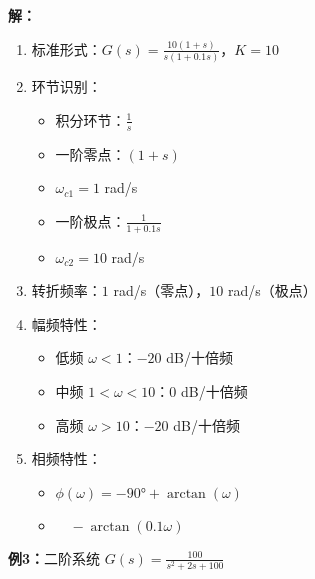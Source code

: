 \begin{tcolorbox}[colback=blue!5!white,colframe=blue!75!black,title=例2求解过程与伯德图]

\begin{minipage}[t]{0.47\textwidth}
\textbf{解：}
\begin{enumerate}
    \item 标准形式：$G(s) = \frac{10(1+s)}{s(1+0.1s)}$，$K = 10$
    \item 环节识别：
    \begin{itemize}
        \item 积分环节：$\frac{1}{s}$
        \item 一阶零点：$(1+s)$
        \item $\omega_{c1} = 1$ rad/s
        \item 一阶极点：$\frac{1}{1+0.1s}$
        \item $\omega_{c2} = 10$ rad/s
    \end{itemize}
    \item 转折频率：$1$ rad/s（零点），$10$ rad/s（极点）
    \item 幅频特性：
    \begin{itemize}
        \item 低频 $\omega<1$：$-20$ dB/十倍频
        \item 中频 $1<\omega<10$：$0$ dB/十倍频
        \item 高频 $\omega>10$：$-20$ dB/十倍频
    \end{itemize}
    \item 相频特性：
    \begin{itemize}
        \item $\phi(\omega) = -90° + \arctan(\omega)$ 
        \item $\quad - \arctan(0.1\omega)$
    \end{itemize}
\end{enumerate}
\end{minipage}\hfill
\begin{minipage}[t]{0.47\textwidth}
\end{minipage}

\end{tcolorbox}

\textbf{例3：}二阶系统 $G(s) = \frac{100}{s^2 + 2s + 100}$


